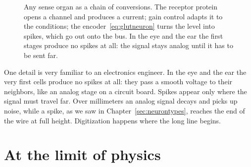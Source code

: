 \begin{figure}[t]
\centering
{}
\caption{Any sense organ as a chain of conversions. The receptor protein opens a channel and produces a current; gain control adapts it to the conditions; the encoder~\eqref{eq:glutneuron} turns the level into spikes, which go out onto the  bus. In the eye and the ear the first stages produce no spikes at all: the signal stays analog until it has to be sent far.}
\label{fig:transducer}
\end{figure}

One detail is very familiar to an electronics engineer. In the eye and the ear the very first cells produce no spikes at all: they pass a smooth voltage to their neighbors, like an analog stage on a circuit board. Spikes appear only where the signal must travel far. Over millimeters an analog signal decays and picks up noise, while a spike, as we saw in Chapter~\ref{sec:neurontypes}, reaches the end of the wire at full height. Digitization happens where the long line begins.

\section{At the limit of physics}


